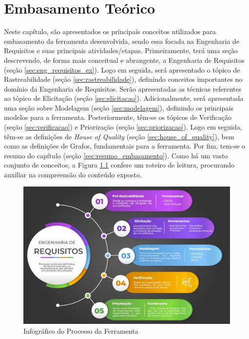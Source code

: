 \chapter[Embasamento Teórico]{Embasamento Teórico}

\label{chap:embasamento_teorico}

Neste capítulo, são apresentados os principais conceitos utilizados para embasamento da ferramenta desenvolvida, sendo essa focada na Engenharia de Requisitos e suas principais atividades/etapas. Primeiramente, terá uma seção descrevendo, de forma mais conceitual e abrangente, a Engenharia de Requisitos (seção \ref{sec:eng_requisitos_ex}). Logo em seguida, será apresentado o tópico de Rastreabilidade (seção \ref{sec:rastreabilidade}), definindo conceitos importantes no domínio da Engenharia de Requisitos. Serão apresentadas as técnicas referentes ao tópico de Elicitação (seção \ref{sec:elicitacao}). Adicionalmente, será apresentada uma seção sobre Modelagem (seção \ref{sec:modelagem}), definindo os principais modelos para a ferramenta. Posteriormente, têm-se os tópicos de Verificação (seção \ref{sec:verificacao}) e Priorização (seção \ref{sec:priorizacao}). Logo em seguida, têm-se as definições de \textit{House of Quality} (seção \ref{sec:house_of_quality}), bem como as definições de Grafos, fundamentais para a ferramenta. Por fim, tem-se o resumo do capítulo (seção \ref{sec:resumo_embasamento}). Como há um vasto conjunto de conceitos, a Figura \ref{fig:roadmap} confere um roteiro de leitura, procurando auxiliar na compreensão do conteúdo exposto.

\begin{figure}[]
    \begin{center}
        \caption{Infográfico do Processo da Ferramenta}
        \label{fig:roadmap}
        \includegraphics[scale=0.58]{figuras/Embasamento/infografico_engenharia_requisitos.png}
    \end{center}
\end{figure}

